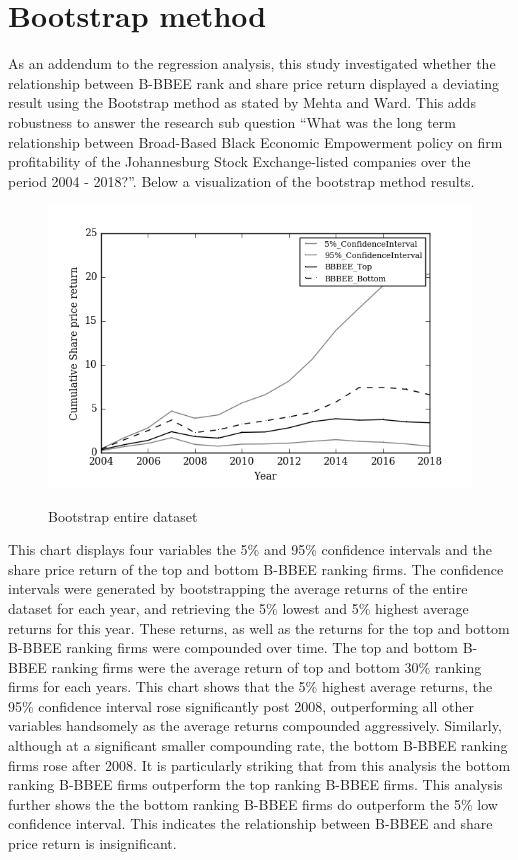 \section{Bootstrap method}
As an addendum to the regression analysis, this study investigated whether the relationship between B-BBEE rank and share price return displayed a deviating result using the Bootstrap method as stated by Mehta and Ward. This adds robustness to answer the research sub question “What was the long term relationship between Broad-Based Black Economic Empowerment policy on firm profitability of the Johannesburg Stock Exchange-listed companies over the period 2004 - 2018?”. Below a visualization of the bootstrap method results.
\begin{figure}[!h]
  \centering
  \includegraphics [scale=1]{Images/Bootstrap_All.png} \\
  {\small {\it \caption{Bootstrap entire dataset \label{fig:moun} }}}
\end{figure}
This chart displays four variables the 5\% and 95\% confidence intervals and the share price return of the top and bottom B-BBEE ranking firms. The confidence intervals were generated by bootstrapping the average returns of the entire dataset for each year, and retrieving the 5\% lowest and 5\% highest average returns for this year. These returns, as well as the returns for the top and bottom B-BBEE ranking firms were compounded over time. The top and bottom B-BBEE ranking firms were the average return of top and bottom 30\% ranking firms for each years. This chart shows that the 5\% highest average returns, the 95\% confidence interval rose significantly post 2008, outperforming all other variables handsomely as the average returns compounded aggressively. Similarly, although at a significant smaller compounding rate, the bottom B-BBEE ranking firms rose after 2008. It is particularly striking that from this analysis the bottom ranking B-BBEE firms outperform the top ranking B-BBEE firms. This analysis further shows the the bottom ranking B-BBEE firms do outperform the 5\% low confidence interval. This indicates the relationship between B-BBEE and share price return is insignificant. 

